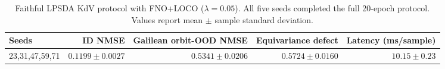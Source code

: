 \begin{table}[t]
\centering
\small
\caption{Faithful LPSDA KdV protocol with FNO+LOCO (\(\lambda=0.05\)). All five seeds completed the full 20-epoch protocol. Values report mean $\pm$ sample standard deviation.}
\label{tab:lpsda-kdv-faithful-loco-checkpoint}
\begin{tabular}{lrrrr}
\toprule
Seeds & ID NMSE & Galilean orbit-OOD NMSE & Equivariance defect & Latency (ms/sample) \\
\midrule
23,31,47,59,71 & \(0.1199 \pm 0.0027\) & \(0.5341 \pm 0.0206\) & \(0.5724 \pm 0.0160\) & \(10.15 \pm 0.23\) \\
\bottomrule
\end{tabular}
\end{table}
